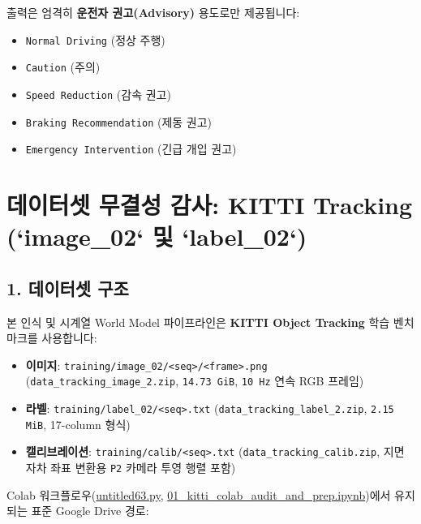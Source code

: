 \documentclass[10.5pt,a4paper]{article}
\begin{document}
출력은 엄격히 \textbf{운전자 권고(Advisory)} 용도로만 제공됩니다:

\begin{itemize}[leftmargin=1.5em,itemsep=2pt]
\item \texttt{Normal Driving} (정상 주행)
\item \texttt{Caution} (주의)
\item \texttt{Speed Reduction} (감속 권고)
\item \texttt{Braking Recommendation} (제동 권고)
\item \texttt{Emergency Intervention} (긴급 개입 권고)
\end{itemize}
\newpage
\section{데이터셋 무결성 감사: KITTI Tracking (`image\_02` 및 `label\_02`)}

\subsection{1. 데이터셋 구조}

본 인식 및 시계열 World Model 파이프라인은 \textbf{KITTI Object Tracking} 학습 벤치마크를 사용합니다:

\begin{itemize}[leftmargin=1.5em,itemsep=2pt]
\item \textbf{이미지}: \texttt{training/\allowbreak{}image\_\allowbreak{}02/\allowbreak{}<seq>/\allowbreak{}<frame>.\allowbreak{}png} (\texttt{data\_\allowbreak{}tracking\_\allowbreak{}image\_\allowbreak{}2.\allowbreak{}zip}, \texttt{14.\allowbreak{}73 GiB}, \texttt{10 Hz} 연속 RGB 프레임)
\item \textbf{라벨}: \texttt{training/\allowbreak{}label\_\allowbreak{}02/\allowbreak{}<seq>.\allowbreak{}txt} (\texttt{data\_\allowbreak{}tracking\_\allowbreak{}label\_\allowbreak{}2.\allowbreak{}zip}, \texttt{2.\allowbreak{}15 MiB}, 17-column 형식)
\item \textbf{캘리브레이션}: \texttt{training/\allowbreak{}calib/\allowbreak{}<seq>.\allowbreak{}txt} (\texttt{data\_\allowbreak{}tracking\_\allowbreak{}calib.\allowbreak{}zip}, 지면 자차 좌표 변환용 \texttt{P2} 카메라 투영 행렬 포함)
\end{itemize}

Colab 워크플로우(\href{https://github.com/Heisnotanimposter/Totalcare\_autonomous\_driving\_Yolov5/blob/main/untitled63.py}{untitled63.py}, \href{https://github.com/Heisnotanimposter/Totalcare\_autonomous\_driving\_Yolov5/blob/main/colab/01\_kitti\_colab\_audit\_and\_prep.ipynb}{01\_kitti\_colab\_audit\_and\_prep.ipynb})에서 유지되는 표준 Google Drive 경로:
\end{document}
